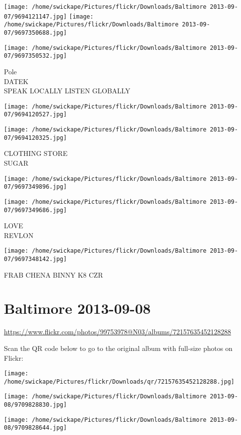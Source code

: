 \documentclass[10pt,letterpaper]{article}
\begin{document}
\texttt{[image: /home/swickape/Pictures/flickr/Downloads/Baltimore 2013-09-07/9694121147.jpg]}
\texttt{[image: /home/swickape/Pictures/flickr/Downloads/Baltimore 2013-09-07/9697350688.jpg]}

\texttt{[image: /home/swickape/Pictures/flickr/Downloads/Baltimore 2013-09-07/9697350532.jpg]}

Pole\\
DATEK\\
SPEAK LOCALLY LISTEN GLOBALLY
\pagebreak

\texttt{[image: /home/swickape/Pictures/flickr/Downloads/Baltimore 2013-09-07/9694120527.jpg]}

\vspace{0.25in}
\texttt{[image: /home/swickape/Pictures/flickr/Downloads/Baltimore 2013-09-07/9694120325.jpg]}

CLOTHING STORE\\
SUGAR
\pagebreak

\texttt{[image: /home/swickape/Pictures/flickr/Downloads/Baltimore 2013-09-07/9697349896.jpg]}

\vspace{0.25in}
\texttt{[image: /home/swickape/Pictures/flickr/Downloads/Baltimore 2013-09-07/9697349686.jpg]}

LOVE\\
REVLON
\pagebreak

\texttt{[image: /home/swickape/Pictures/flickr/Downloads/Baltimore 2013-09-07/9697348142.jpg]}

FRAB CHENA BINNY K8 CZR
\pagebreak

\section*{Baltimore 2013-09-08}

\url{https://www.flickr.com/photos/99753978@N03/albums/72157635452128288}

Scan the QR code below to go to the original album with full-size photos on Flickr:

\texttt{[image: /home/swickape/Pictures/flickr/Downloads/qr/72157635452128288.jpg]}
\pagebreak

\texttt{[image: /home/swickape/Pictures/flickr/Downloads/Baltimore 2013-09-08/9709828830.jpg]}

\vspace{0.25in}
\texttt{[image: /home/swickape/Pictures/flickr/Downloads/Baltimore 2013-09-08/9709828644.jpg]}
\end{document}
